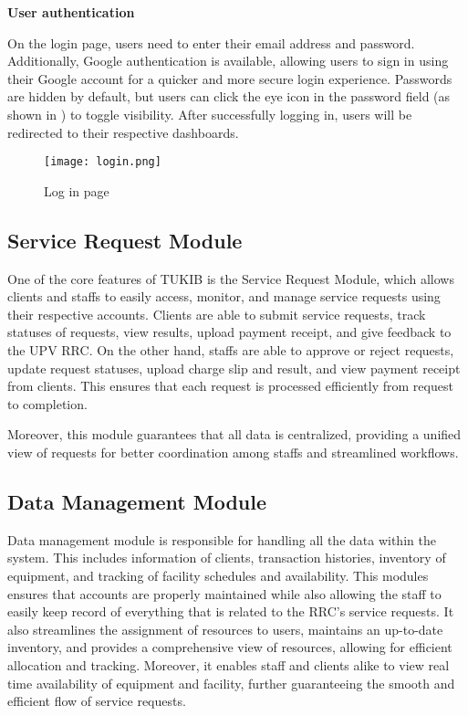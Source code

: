 \textbf{User authentication}

On the login page, users need to enter their email address and password. Additionally, Google authentication is available, allowing users to sign in using their Google account for a quicker and more secure login experience. Passwords are hidden by default, but users can click the eye icon in the password field (as shown in ) to toggle visibility. After successfully logging in, users will be redirected to their respective dashboards.

\newpage

\begin{figure}[h]
	\centering
	\texttt{[image: login.png]}
	\caption{Log in page}
	\label{fig:login}
\end{figure}

\subsection{Service Request Module}

One of the core features of TUKIB is the Service Request Module, which allows clients and staffs to easily access, monitor, and manage service requests using their respective accounts. Clients are able to submit service requests, track statuses of requests, view results, upload payment receipt, and give feedback to the UPV RRC. On the other hand, staffs are able to approve or reject requests, update request statuses, upload charge slip and result, and view payment receipt from clients. This ensures that each request is processed efficiently from request to completion. 

Moreover, this module guarantees that all data is centralized, providing a unified view of requests for better coordination among staffs and streamlined workflows. 

\subsection{Data Management Module}

Data management module is responsible for handling all the data within the system. This includes information of clients, transaction histories, inventory of equipment, and tracking of facility schedules and availability. This modules ensures that accounts are properly maintained while also allowing the staff to easily keep record of everything that is related to the RRC's service requests. It also streamlines the assignment of resources to users, maintains an up-to-date inventory, and provides a comprehensive view of resources, allowing for efficient allocation and tracking. Moreover, it enables staff and clients alike to view real time availability of equipment and facility, further guaranteeing the smooth and efficient flow of  service requests.

